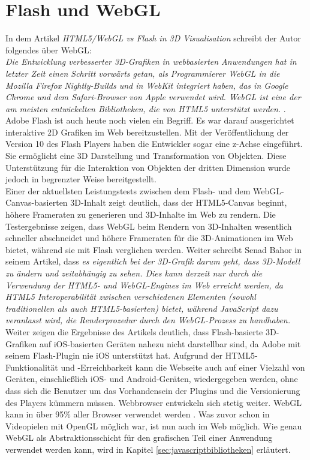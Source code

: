 \section{Flash und WebGL}
\label{sec:webgl2}
%
In dem Artikel \emph{HTML5/WebGL vs Flash in 3D Visualisation} schreibt der Autor folgendes über WebGL:\\

\textit{\glqq Die Entwicklung verbesserter 3D-Grafiken in webbasierten Anwendungen hat in letzter Zeit einen Schritt vorwärts getan, als Programmierer WebGL in die Mozilla Firefox Nightly-Builds und in WebKit integriert haben, das in Google Chrome und dem Safari-Browser von Apple verwendet wird. WebGL ist eine der am meisten entwickelten Bibliotheken, die von HTML5 unterstützt werden.\grqq } \cite{bahor_html5/webgl_2013}.\\

Adobe Flash ist auch heute noch vielen ein Begriff. Es war darauf ausgerichtet interaktive 2D Grafiken im Web bereitzustellen. Mit der Veröffentlichung der Version 10 des Flash Players haben die Entwickler sogar eine z-Achse eingeführt. Sie ermöglicht eine 3D Darstellung und Transformation von Objekten. Diese Unterstützung für die Interaktion von Objekten der dritten Dimension wurde jedoch in begrenzter Weise bereitgestellt.\\
Einer der aktuellsten Leistungstests zwischen dem Flash- und dem WebGL-Canvas-basierten 3D-Inhalt zeigt deutlich, dass der HTML5-Canvas beginnt, höhere Frameraten zu generieren und 3D-Inhalte im Web zu rendern. Die Testergebnisse zeigen, dass WebGL beim Rendern von 3D-Inhalten wesentlich schneller abschneidet und höhere Frameraten für die 3D-Animationen im Web bietet, während sie mit Flash verglichen werden. Weiter schreibt Senad Bahor in seinem Artikel, dass \textit{es eigentlich bei der 3D-Grafik darum geht, dass 3D-Modell zu ändern und zeitabhängig zu sehen. Dies kann derzeit nur durch die Verwendung der HTML5- und WebGL-Engines im Web erreicht werden, da HTML5 Interoperabilität zwischen verschiedenen Elementen (sowohl traditionellen als auch HTML5-basierten) bietet, während JavaScript dazu veranlasst wird, die Renderprozedur durch den WebGL-Prozess zu handhaben.}\cite{bahor_html5/webgl_2013}\\
Weiter zeigen die Ergebnisse des Artikels deutlich, dass Flash-basierte 3D-Grafiken auf iOS-basierten Geräten nahezu nicht darstellbar sind, da Adobe mit seinem Flash-Plugin nie iOS unterstützt hat. Aufgrund der HTML5-Funktionalität und -Erreichbarkeit kann die Webseite auch auf einer Vielzahl von Geräten, einschließlich iOS- und Android-Geräten, wiedergegeben werden, ohne dass sich die Benutzer um das Vorhandensein der Plugins und die Versionierung des Players kümmern müssen.
Webbrowser entwickeln sich stetig weiter. WebGL kann in über 95\% aller Browser verwendet werden \cite{deveria_alexis_can_2013}. Was zuvor schon in Videopielen mit OpenGL möglich war, ist nun auch im Web möglich. Wie genau WebGL als Abstraktionsschicht für den grafischen Teil einer Anwendung verwendet werden kann, wird in Kapitel \ref{sec:javascriptbibliotheken} erläutert.

